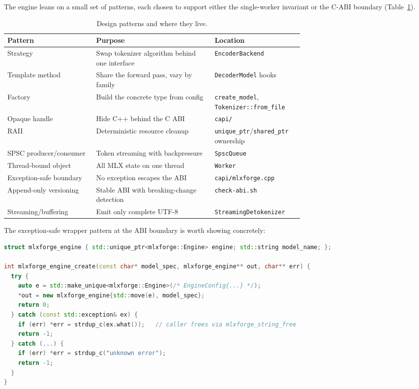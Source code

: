 \documentclass[11pt,a4paper]{report}
\newcommand{\code}[1]{\texttt{#1}}
\begin{document}
The engine leans on a small set of patterns, each chosen to support either the
single-worker invariant or the C-ABI boundary (Table~\ref{tab:patterns}).

\begin{table}[h]
\centering
\caption{Design patterns and where they live.}
\label{tab:patterns}
\small
\begin{tabular}{@{}l p{0.40\linewidth} p{0.30\linewidth}@{}}
\toprule
Pattern & Purpose & Location \\
\midrule
Strategy            & Swap tokenizer algorithm behind one interface & \code{EncoderBackend} \\
Template method     & Share the forward pass, vary by family        & \code{DecoderModel} hooks \\
Factory             & Build the concrete type from config           & \code{create\_model}, \code{Tokenizer::from\_file} \\
Opaque handle       & Hide C++ behind the C ABI                     & \code{capi/} \\
RAII                & Deterministic resource cleanup                & \code{unique\_ptr}/\code{shared\_ptr} ownership \\
SPSC producer/consumer & Token streaming with backpressure          & \code{SpscQueue} \\
Thread-bound object & All MLX state on one thread                   & \code{Worker} \\
Exception-safe boundary & No exception escapes the ABI              & \code{capi/mlxforge.cpp} \\
Append-only versioning & Stable ABI with breaking-change detection  & \code{check-abi.sh} \\
Streaming/buffering & Emit only complete UTF-8                      & \code{StreamingDetokenizer} \\
\bottomrule
\end{tabular}
\end{table}

The exception-safe wrapper pattern at the ABI boundary is worth showing concretely:

\begin{lstlisting}[language=C++,caption={Every C-ABI entry point catches all exceptions and reports via the out-parameter.}]
struct mlxforge_engine { std::unique_ptr<mlxforge::Engine> engine; std::string model_name; };

int mlxforge_engine_create(const char* model_spec, mlxforge_engine** out, char** err) {
  try {
    auto e = std::make_unique<mlxforge::Engine>(/* EngineConfig{...} */);
    *out = new mlxforge_engine{std::move(e), model_spec};
    return 0;
  } catch (const std::exception& ex) {
    if (err) *err = strdup_c(ex.what());   // caller frees via mlxforge_string_free
    return -1;
  } catch (...) {
    if (err) *err = strdup_c("unknown error");
    return -1;
  }
}
\end{lstlisting}
\end{document}

